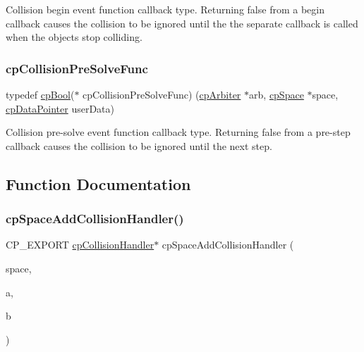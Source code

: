 Collision begin event function callback type. Returning false from a begin callback causes the collision to be ignored until the the separate callback is called when the objects stop colliding. \mbox{\label{group__cp_space_ga89b24d53d81a5a028198c3c2d3c39a9d}} 
\subsubsection{\texorpdfstring{cp\+Collision\+Pre\+Solve\+Func}{cpCollisionPreSolveFunc}}
{\footnotesize\ttfamily typedef \mbox{\hyperlink{group__basic_types_gabc5e752c48f3449ca26ef413ecbd647e}{cp\+Bool}}($\ast$ cp\+Collision\+Pre\+Solve\+Func) (\mbox{\hyperlink{structcp_arbiter}{cp\+Arbiter}} $\ast$arb, \mbox{\hyperlink{structcp_space}{cp\+Space}} $\ast$space, \mbox{\hyperlink{group__basic_types_ga2ac2c3c31e21893941f9e4f8ee279447}{cp\+Data\+Pointer}} user\+Data)}

Collision pre-\/solve event function callback type. Returning false from a pre-\/step callback causes the collision to be ignored until the next step. 

\subsection{Function Documentation}
\mbox{\label{group__cp_space_ga54371fd2b5a430447dfc62826006a484}} 
\subsubsection{\texorpdfstring{cp\+Space\+Add\+Collision\+Handler()}{cpSpaceAddCollisionHandler()}}
{\footnotesize\ttfamily C\+P\+\_\+\+E\+X\+P\+O\+RT \mbox{\hyperlink{structcp_collision_handler}{cp\+Collision\+Handler}}$\ast$ cp\+Space\+Add\+Collision\+Handler (\begin{DoxyParamCaption}\item[{\mbox{\hyperlink{structcp_space}{cp\+Space}} $\ast$}]{space,  }\item[{\mbox{\hyperlink{group__basic_types_gae83e2f50965eb441e36ffff1e32e6d02}{cp\+Collision\+Type}}}]{a,  }\item[{\mbox{\hyperlink{group__basic_types_gae83e2f50965eb441e36ffff1e32e6d02}{cp\+Collision\+Type}}}]{b }\end{DoxyParamCaption})}

